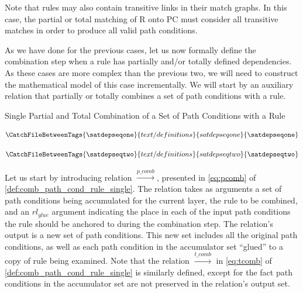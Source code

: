 Note that rules may also contain transitive links in their match graphs. In this case, the partial or total matching of R onto PC must consider all transitive matches in order to produce all valid path conditions.

As we have done for the previous cases, let us now formally define the combination step when a rule has partially and/or totally defined dependencies. As these cases are more complex than the previous two, we will need to construct the mathematical model of this case incrementally. We will start by an auxiliary relation that partially or totally combines a set of path conditions with a rule.

\begin{definition}{Single Partial and Total Combination of a Set of Path Conditions with a Rule\\}
\label{def:comb_path_cond_rule_single}

\begin{align}
\label{eq:pcomb}
\CatchFileBetweenTags{\satdepseqone}{text/definitions}{satdepseqone}{\satdepseqone}
\end{align}


\begin{align}
\label{eq:tcomb}
\CatchFileBetweenTags{\satdepseqtwo}{text/definitions}{satdepseqtwo}{\satdepseqtwo}
\end{align}

\end{definition}


Let us start by introducing relation $\stackrel{p\_comb}{\rightarrow}$, presented in \cref{eq:pcomb} of \cref{def:comb_path_cond_rule_single}. The relation takes as arguments a set of path conditions being accumulated for the current layer, the rule to be combined, and an $rl_{glue}$ argument indicating the place in each of the input path conditions the rule should be anchored to during the combination step. The relation's output is a new set of path conditions. This new set includes all the original path conditions, as well as each path condition in the accumulator set ``glued'' to a copy of rule being examined. Note that the relation $\stackrel{t\_comb}{\rightarrow}$ in \cref{eq:tcomb} of \cref{def:comb_path_cond_rule_single} is similarly defined, except for the fact path conditions in the accumulator set are not preserved in the relation's output set.\\

\setcounter{equation}{0} 

